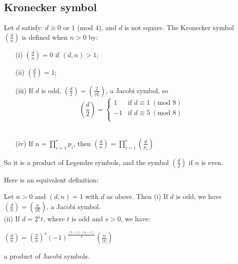 \subsection{Kronecker symbol}
\begin{definition} Let $d$ satisfy: $d \equiv 0$ or $1$ (mod $4$), and $d$ is not square. The Kronecker symbol $(\frac{d}{n})$ is defined when $n>0$ by:
\begin{enumerate}
\item[(i)] $(\frac{d}{n})=0$ if $(d,n)>1$;
\item[(ii)] $(\frac{d}{1})=1$;
\item[(iii)] If $d$ is odd, $(\frac{d}{2})=(\frac{2}{|d|})$, a Jacobi symbol, so
\begin{equation*}
\left(\frac{d}{2}\right)= \left\{
\begin{array}{ll}
1 & \text{if } d \equiv 1~(\text{mod } 8)\\
-1 & \text{if } d \equiv 5~(\text{mod } 8)\\
\end{array} \right.
\end{equation*}\\
\item[(iv)] If $n=\prod_{i=1}^{r}p_i$, then $(\frac{d}{n})=\prod_{i=1}^{r}(\frac{d}{p_i})$
\end{enumerate}
So it is a product of Legendre symbols, and the symbol $(\frac{d}{2})$ if $n$ is even.
\end{definition}
Here is an equivalent definition:
\begin{theorem} Let $n>0$ and $(d,n)=1$ with $d$ as above. Then
(i) If $d$ is odd, we have $(\frac{d}{n})=(\frac{n}{|d|})$, a Jacobi symbol.\\
(ii) If $d=2^s t$, where $t$ is odd and $s>0$, we have:
\begin{center}
$(\frac{d}{n})=(\frac{2}{n})^s (-1)^{\frac{(t-1)(n-1)}{4}}(\frac{n}{|t|})$
\end{center}
a product of Jacobi symbols.
\end{theorem}

